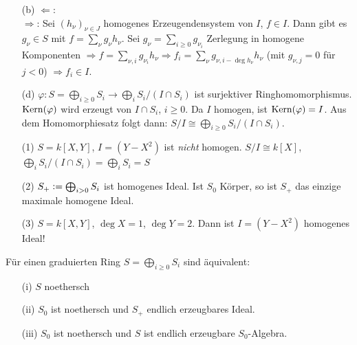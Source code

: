 \documentclass[a4paper, 10pt]{report}
\begin{document}
\begin{Bew}
\begin{enumerate}
\item[(b)] \glqq$\Leftarrow$\grqq: \chk\\
\glqq$\Rightarrow$\grqq: Sei $(h_{\nu})_{\nu\in J}$ homogenes Erzeugendensystem von $I$,
$f\in I$. Dann gibt es $g_\nu\in S$ mit $f=\sum_{\nu}g_\nu h_\nu$.
Sei $g_\nu=\sum_{i\geq 0}g_{\nu_i}$ Zerlegung in homogene Komponenten
$\Rightarrow f=\sum_{\nu, i} g_{\nu_i}h_\nu
\Rightarrow f_i=\sum_\nu g_{\nu,i-\deg{h_\nu}}h_\nu$ 
(mit $g_{\nu,j}=0$ f\"ur $j< 0$) $\Rightarrow f_i\in I$.

\item[(d)] $\varphi:S=\bigoplus_{i\geq 0}S_i\to \bigoplus_i S_i/(I\cap S_i)$ ist
surjektiver Ringhomomorphismus. $\mathrm{Kern}(\varphi)$ wird erzeugt von $I\cap S_i$, $i\geq 0$.
Da $I$ homogen, ist $\mathrm{Kern}(\varphi)=I$. Aus dem Homomorphiesatz folgt dann:
$S/I\cong \bigoplus_{i\geq 0}S_i/(I\cap S_i)$.
\end{enumerate}
\end{Bew}

\begin{nnBsp}
\begin{enumerate}

\item[(1)] $S=k[X,Y]$, $I=(Y-X^2)$ ist \emph{nicht} homogen.
$S/I\cong k[X]$, $\bigoplus_i S_i/(I\cap S_i)=\bigoplus_i S_i=S$

\item[(2)] $S_{+}\mathrel{\mathop:}=\bigoplus_{i> 0}S_i$ ist homogenes Ideal.
Ist $S_0$ K\"orper, so ist $S_{+}$ das einzige maximale homogene Ideal.

\item[(3)] $S=k[X,Y]$, $\deg{X}=1$, $\deg{Y}=2$. 
Dann ist $I=(Y-X^2)$ homogenes Ideal!

\end{enumerate}
\end{nnBsp}

\begin{DefBem}
\label{2.15}
F\"ur einen graduierten Ring $S=\bigoplus_{i\geq 0} S_i$ sind \"aquivalent:
\begin{enumerate}
\item[(i)] $S$ noethersch
\item[(ii)] $S_0$ ist noethersch und $S_{+}$ endlich erzeugbares Ideal.
\item[(iii)] $S_0$ ist noethersch und $S$ ist endlich erzeugbare $S_0$-Algebra.
\end{enumerate}
\end{DefBem}
\end{document}
